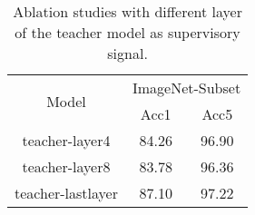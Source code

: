 
\begin{table}[]
\centering
\scalebox{0.9}
{
\begin{tabular}{c|cc}
\midrule
\multirow{2}{*}{Model} & \multicolumn{2}{c}{ImageNet-Subset} \\
                       & \multicolumn{1}{c|}{Acc1}   & Acc5  \\ \midrule
teacher-layer4          & 84.26                            &     96.90  \\
teacher-layer8                 &   83.78                          &   96.36    \\
teacher-lastlayer                 &   87.10                          &  97.22     \\
\midrule
\end{tabular}}
\caption{
Ablation studies with different layer of the teacher model as supervisory signal.
}
\label{tab:aba_one}
\end{table}